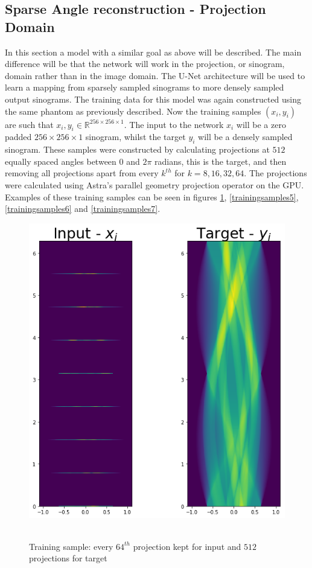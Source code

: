 \subsection{Sparse Angle reconstruction - Projection Domain}

In this section a model with a similar goal as above will be described. The main difference will be that the network will work in the projection, or sinogram, domain rather
than in the image domain. The U-Net architecture will be used to learn a mapping from sparsely sampled sinograms to more densely sampled output sinograms. The training data 
for this model was again constructed using the same phantom as previously described. Now the training samples $(x_i,y_i)$ are such that $x_i,y_i \in \mathbb{R}^{256 \times 256 \times 1}$. 
The input to the network $x_i$ will be a zero padded ${256 \times 256 \times 1}$ sinogram, whilst the target $y_i$ will be a densely sampled sinogram. These samples were 
constructed by calculating projections at $512$ equally spaced angles between $0$ and $2 \pi$ radians, this is the target, and then removing all projections apart from every
$k^{th}$ for $k=8, 16, 32, 64$. The projections were calculated using Astra's parallel geometry projection operator on the GPU. Examples of these training samples can 
be seen in figures \ref{trainingsamples4}, \ref{trainingsamples5}, \ref{trainingsamples6} and \ref{trainingsamples7}.

\begin{figure}[htb]
\centering
     \includegraphics[width= 0.7 \textwidth]{figures/trainingsamples4} \
  \caption{Training sample: every $64^{th}$ projection kept for input and $512$ projections for target}
  \label{trainingsamples4}
\end{figure}

